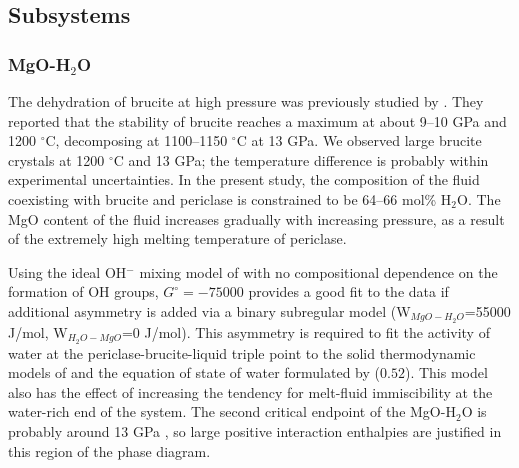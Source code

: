 \documentclass[review]{elsarticle}
\begin{document}
\subsection{Subsystems}
\subsubsection{MgO-H$_2$O}
The dehydration of brucite at high pressure was previously studied by \cite{FIYKFO2005}. They reported that the stability of brucite reaches a maximum at about 9--10 GPa and 1200 $^{\circ}$C, decomposing at 1100--1150 $^{\circ}$C at 13 GPa. We observed large brucite crystals at 1200 $^{\circ}$C and 13 GPa; the temperature difference is probably within experimental uncertainties. In the present study, the composition of the fluid coexisting with brucite and periclase is constrained to be 64--66 mol\% H$_2$O. The MgO content of the fluid increases gradually with increasing pressure, as a result of the extremely high melting temperature of periclase. 

Using the ideal OH$^-$ mixing model of \cite{SS1985} with no compositional dependence on the formation of OH groups, $G^{\circ}= -75000$ provides a good fit to the data if additional asymmetry is added via a binary subregular model (W$_{MgO-H_2O}$=55000 J/mol, W$_{H_2O-MgO}$=0 J/mol). This asymmetry is required to fit the activity of water at the periclase-brucite-liquid triple point to the solid thermodynamic models of \citep{HP2011} and the equation of state of water formulated by \cite{PS1995} ($0.52$). This model also has the effect of increasing the tendency for melt-fluid immiscibility at the water-rich end of the system. The second critical endpoint of the MgO-H$_2$O is probably around 13 GPa \citep{MSUP2007}, so large positive interaction enthalpies are justified in this region of the phase diagram. 
\end{document}
